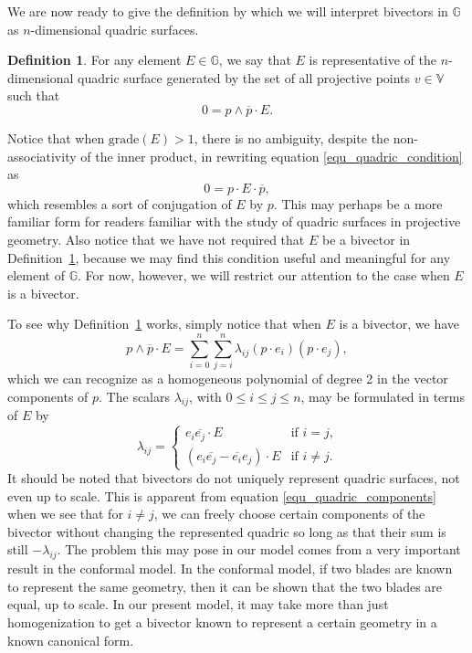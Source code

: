 \documentclass{ecgd-l}
\newcommand{\G}{\mathbb{G}}
\newcommand{\V}{\mathbb{V}}
\theoremstyle{definition}
\newtheorem{definition}[theorem]{Definition}
\theoremstyle{remark}
\numberwithin{equation}{section}
\begin{document}
We are now ready to give the definition by which we will interpret bivectors in $\G$
as $n$-dimensional quadric surfaces.
\begin{definition}\label{def_quadric}
For any element $E\in\G$, we say that $E$ is representative of the $n$-dimensional
quadric surface generated by the set of all projective points $v\in\V$ such that
\begin{equation}\label{equ_quadric_condition}
0 = p\wedge\overline{p}\cdot E.
\end{equation}
\end{definition}
Notice that when $\mbox{grade}(E)>1$, there is no ambiguity, despite the non-associativity
of the inner product, in rewriting equation
\eqref{equ_quadric_condition} as
\begin{equation}
0 = p\cdot E\cdot\overline{p},
\end{equation}
which resembles a sort of conjugation of $E$ by $p$.  This may perhaps be a more
familiar form for readers familiar with the study of quadric surfaces in projective geometry.
Also notice that we have not required that $E$ be a bivector in Definition~\ref{def_quadric},
because we may find this condition useful and meaningful for any element of $\G$.  For now,
however, we will restrict our attention to the case when $E$ is a bivector.

To see why Definition~\ref{def_quadric} works, simply notice that when $E$ is a bivector, we have
\begin{equation}\label{equ_homogeneous_polynomial}
p\wedge\overline{p}\cdot E=\sum_{i=0}^n\sum_{j=i}^n \lambda_{ij}(p\cdot e_i)(p\cdot e_j),
\end{equation}
which we can recognize as a homogeneous polynomial of degree 2 in the vector components of $p$.
The scalars $\lambda_{ij}$, with $0\leq i\leq j\leq n$, may be formulated in terms of $E$ by
\begin{equation}\label{equ_quadric_components}
\lambda_{ij} = \left\{\begin{array}{ll}
e_i\overline{e_j}\cdot E & \mbox{if $i=j$,} \\
\left(e_i\overline{e_j}-\overline{e_i}e_j\right)\cdot E & \mbox{if $i\neq j$.}
\end{array}\right.
\end{equation}
It should be noted that bivectors do not uniquely represent quadric surfaces, not even up to scale.
This is apparent from equation \eqref{equ_quadric_components} when we see that for $i\neq j$,
we can freely choose certain components of the bivector without changing the represented
quadric so long as that their sum is still $-\lambda_{ij}$.  The problem this may pose in our model
comes from a very important result in the conformal model.  In the conformal model, if
two blades are known to represent the same geometry, then it can be shown that the
two blades are equal, up to scale.  In our present model, it may take more than just
homogenization to get a bivector known to represent a certain geometry in a
known canonical form.
\end{document}
